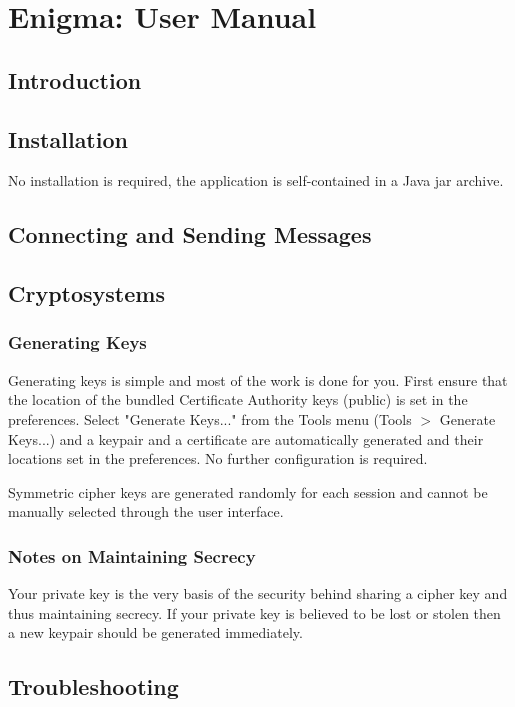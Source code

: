 
\chapter{Enigma: User Manual}
\label{AppendixD}

\section{Introduction}

\section{Installation}

No installation is required, the application is self-contained in a Java jar archive. 

\section{Connecting and Sending Messages}

\section{Cryptosystems}

  \subsection{Generating Keys}
  
  Generating keys is simple and most of the work is done for you. First ensure that the location of the bundled Certificate Authority keys (public) is set in the preferences. Select "Generate Keys..." from the Tools menu (Tools $>$ Generate Keys...) and a keypair and a certificate are automatically generated and their locations set in the preferences. No further configuration is required.
  
  Symmetric cipher keys are generated randomly for each session and cannot be manually selected through the user interface.

  \subsection{Notes on Maintaining Secrecy}
  
  Your private key is the very basis of the security behind sharing a cipher key and thus maintaining secrecy. If your private key is believed to be lost or stolen then a new keypair should be generated immediately.
  
  
  
\section{Troubleshooting} 